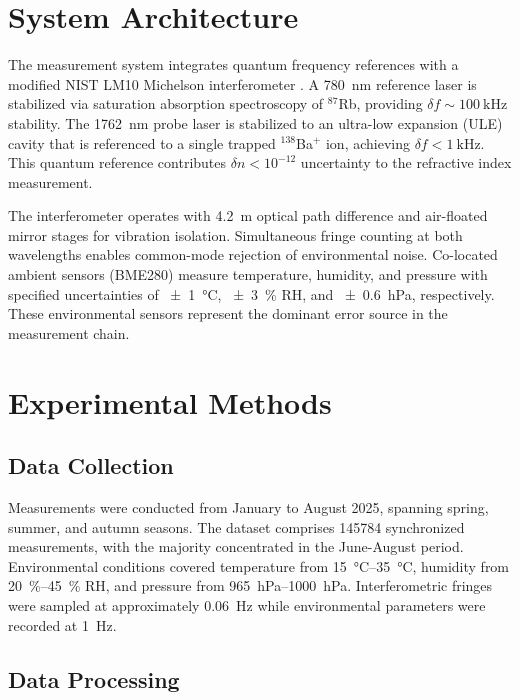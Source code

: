 \documentclass[aps,pra,reprint,groupedaddress,twocolumn,superscriptaddress,linenumbers]{revtex4-2}
\begin{document}
\section{System Architecture}

The measurement system integrates quantum frequency references with a modified NIST LM10 Michelson interferometer \cite{fox1999reliable}. A \SI{780}{\nano\meter} reference laser is stabilized via saturation absorption spectroscopy of $^{87}$Rb, providing $\delta f \sim \SI{100}{\kilo\hertz}$ stability. The \SI{1762}{\nano\meter} probe laser is stabilized to an ultra-low expansion (ULE) cavity that is referenced to a single trapped $^{138}$Ba$^+$ ion, achieving $\delta f < \SI{1}{\kilo\hertz}$. This quantum reference contributes $\delta n < 10^{-12}$ uncertainty to the refractive index measurement.

The interferometer operates with \SI{4.2}{\meter} optical path difference and air-floated mirror stages for vibration isolation. Simultaneous fringe counting at both wavelengths enables common-mode rejection of environmental noise. Co-located ambient sensors (BME280) measure temperature, humidity, and pressure with specified uncertainties of \SI{\pm 1}{\degreeCelsius}, \SI{\pm 3}{\percent} RH, and \SI{\pm 0.6}{\hecto\pascal}, respectively. These environmental sensors represent the dominant error source in the measurement chain.

\section{Experimental Methods}

\subsection{Data Collection}

Measurements were conducted from January to August 2025, spanning spring, summer, and autumn seasons. The dataset comprises \num{145784} synchronized measurements, with the majority concentrated in the June-August period. Environmental conditions covered temperature from \SIrange{15}{35}{\degreeCelsius}, humidity from \SIrange{20}{45}{\percent} RH, and pressure from \SIrange{965}{1000}{\hecto\pascal}. Interferometric fringes were sampled at approximately \SI{0.06}{\hertz} while environmental parameters were recorded at \SI{1}{\hertz}.

\subsection{Data Processing}
\end{document}
